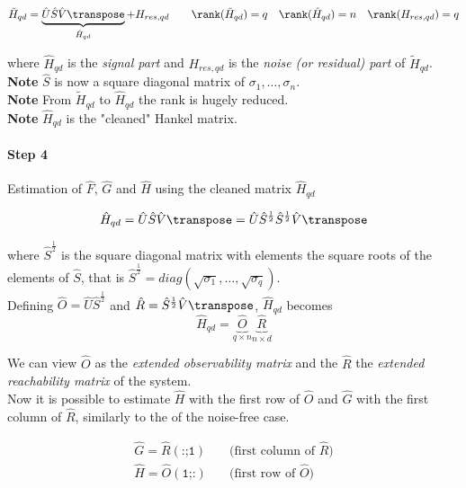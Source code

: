 \[
    \tilde{H}_{qd} = \underbrace{\hat{U} \hat{S} \hat{V}\transpose}_{\hat{H}_{qd}} + H_{res,qd} \qquad \rank (\tilde{H}_{qd}) = q \quad \rank (\hat{H}_{qd}) = n \quad \rank (H_{res,qd}) = q
\]

where $\hat{H}_{qd}$ is the \emph{signal part} and $H_{res,qd}$ is the \emph{noise (or residual) part} of $\tilde{H}_{qd}$.\\

\textbf{Note} $\hat{S}$ is now a square diagonal matrix of $\sigma_1, \dots, \sigma_n$.\\
\textbf{Note} From $\tilde{H}_{qd}$ to $\hat{H}_{qd}$ the rank is hugely reduced.\\
\textbf{Note} $\hat{H}_{qd}$ is the "cleaned" Hankel matrix.

\paragraph{Step 4} Estimation of $\hat{F}$, $\hat{G}$ and $\hat{H}$ using the cleaned matrix $\hat{H}_{qd}$

\[
    \hat{H}_{qd} = \hat{U} \hat{S} \hat{V}\transpose = \hat{U} \hat{S}^{\frac{1}{2}} \hat{S}^{\frac{1}{2}} \hat{V}\transpose
\]

where $\hat{S}^{\frac{1}{2}}$ is the square diagonal matrix with elements the square roots of the elements of $\hat{S}$, that is $\hat{S}^{\frac{1}{2}}=diag(\sqrt{\sigma_1}, \dots, \sqrt{\sigma_q})$. \\

Defining $\hat{O} = \hat{U}\hat{S}^{\frac{1}{2}}$ and $\hat{R} = \hat{S}^{\frac{1}{2}} \hat{V}\transpose$, $\hat{H}_{qd}$ becomes 
\[\hat{H}_{qd} = \underbrace{\hat{O}}_{q\times n} \underbrace{\hat{R}}_{n\times d}\]


We can view $\hat{O}$ as the \emph{extended observability matrix} and the $\hat{R}$ the \emph{extended reachability matrix} of the system. \\

Now it is possible to estimate $\hat{H}$ with the first row of $\hat{O}$ and $\hat{G}$ with the first column of $\hat{R}$, similarly to the  of the noise-free case.

\begin{align*}
    \hat{G} = \hat{R}(\texttt{:;1}) & \quad\text{(first column of $\hat{R}$)} \\
    \hat{H} = \hat{O}(\texttt{1;:}) & \quad\text{(first row of $\hat{O}$)} \\
\end{align*}



